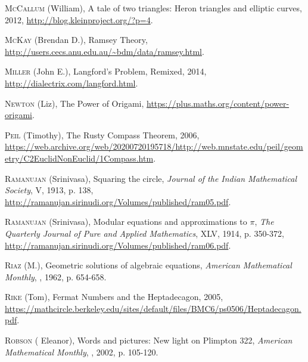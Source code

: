 \begin{thebibliography}{99}
  \textsc{McCallum} (William), \og A tale of two triangles: Heron triangles and elliptic curves\fg, 2012, \url{http://blog.kleinproject.org/?p=4}.

  \textsc{McKay} (Brendan D.), \og Ramsey Theory\fg, \url{http://users.cecs.anu.edu.au/~bdm/data/ramsey.html}.


  \textsc{Miller} (John E.), \og Langford's Problem, Remixed\fg, 2014, \url{http://dialectrix.com/langford.html}.



  \textsc{Newton} (Liz), \og The Power of Origami\fg, \url{https://plus.maths.org/content/power-origami}.


  \textsc{Peil} (Timothy), \og The Rusty Compass Theorem\fg, 2006, \url{https://web.archive.org/web/20200720195718/http://web.mnstate.edu/peil/geometry/C2EuclidNonEuclid/1Compass.htm}.
 




  \textsc{Ramanujan} (Srinivasa), \og Squaring the circle\fg, \emph{Journal of the Indian Mathematical Society}, \no V, 1913, p. 138, \url{http://ramanujan.sirinudi.org/Volumes/published/ram05.pdf}.


  \textsc{Ramanujan} (Srinivasa), \og Modular equations and approximations to $\pi$\fg, \emph{The Quarterly Journal of Pure and Applied Mathematics}, \no XLV, 1914, p. 350-372, \url{http://ramanujan.sirinudi.org/Volumes/published/ram06.pdf}.





  \textsc{Riaz} (M.), \og Geometric solutions of algebraic equations\fg, \emph{American Mathematical Monthly}, , 1962, p. 654-658.






  \textsc{Rike} (Tom), \og Fermat Numbers and the Heptadecagon\fg, 2005, \url{https://mathcircle.berkeley.edu/sites/default/files/BMC6/ps0506/Heptadecagon.pdf}.















 

 \textsc{Robson} ( Eleanor), \og Words and pictures: New light on {Plimpton} 322\fg,   \emph{American Mathematical Monthly}, , 2002, p. 105-120.



\end{thebibliography}
